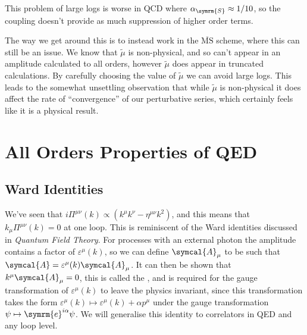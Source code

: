 \documentclass[fleqn]{NotesClass}
\newcommand*{\course}[1]{\textit{#1}}
\newcommand{\MSbar}{\ensuremath{\overline{\text{MS}}}}
\newcommand{\e}{\symrm{e}}
\newcommand{\amplitude}{\symcal{A}}
\newcommand{\minkowskiMetric}{\eta}
\newcommand{\strongCoupling}{\alpha_{\symrm{S}}}
\begin{document}
    This problem of large logs is worse in QCD where \(\strongCoupling \approx 1/10\), so the coupling doesn't provide as much suppression of higher order terms.
    
    The way we get around this is to instead work in the \MSbar{} scheme, where this can still be an issue.
    We know that \(\tilde{\mu}\) is non-physical, and so can't appear in an amplitude calculated to all orders, however \(\tilde{\mu}\) does appear in truncated calculations.
    By carefully choosing the value of \(\tilde{\mu}\) we can avoid large logs.
    This leads to the somewhat unsettling observation that while \(\tilde{\mu}\) is non-physical it does affect the rate of \enquote{convergence} of our perturbative series, which certainly feels like it is a physical result.
    
    \chapter{All Orders Properties of QED}
    \section{Ward Identities}
    We've seen that \(i\Pi^{\mu\nu}(k) \propto (k^\mu k^\nu - \minkowskiMetric^{\mu\nu}k^2)\), and this means that \(k_\mu \Pi^{\mu\nu}(k) = 0\) at one loop.
    This is reminiscent of the Ward identities discussed in \course{Quantum Field Theory}.
    For processes with an external photon the amplitude contains a factor of \(\varepsilon^\mu(k)\), so we can define \(\amplitude_\mu\) to be such that \(\amplitude = \varepsilon^\mu(k)\amplitude_\mu\).
    It can then be shown that \(k^\mu\amplitude_\mu = 0\), this is called the , and is required for the gauge transformation of \(\varepsilon^\mu(k)\) to leave the physics invariant, since this transformation takes the form \(\varepsilon^\mu(k) \mapsto \varepsilon^\mu(k) + \alpha p^\mu\) under the gauge transformation \(\psi \mapsto \e^{i\alpha}\psi\).
    We will generalise this identity to correlators in QED and any loop level.
    
    
\end{document}
